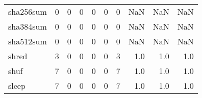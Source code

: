 \begin{tabular}{lrrrrrrrrr}
sha256sum &                                                  0 &                                                  0 &                                                  0 &                                                  0 &                                                  0 &                                                  0 &                                                NaN &                                    NaN &                                  NaN \\
sha384sum &                                                  0 &                                                  0 &                                                  0 &                                                  0 &                                                  0 &                                                  0 &                                                NaN &                                    NaN &                                  NaN \\
sha512sum &                                                  0 &                                                  0 &                                                  0 &                                                  0 &                                                  0 &                                                  0 &                                                NaN &                                    NaN &                                  NaN \\
shred     &                                                  3 &                                                  0 &                                                  0 &                                                  0 &                                                  0 &                                                  3 &                                                1.0 &                                    1.0 &                                  1.0 \\
shuf      &                                                  7 &                                                  0 &                                                  0 &                                                  0 &                                                  0 &                                                  7 &                                                1.0 &                                    1.0 &                                  1.0 \\
sleep     &                                                  7 &                                                  0 &                                                  0 &                                                  0 &                                                  0 &                                                  7 &                                                1.0 &                                    1.0 &                                  1.0 \\

\end{tabular}
